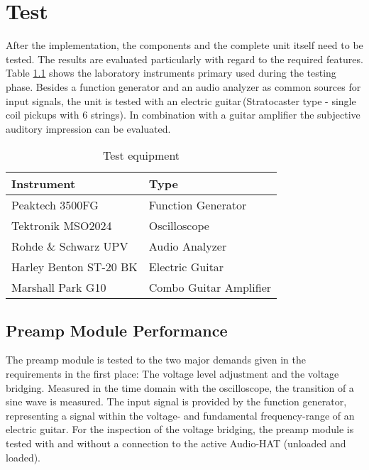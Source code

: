 \newpage
\chapter{Test}

After the implementation, the components and the complete unit itself need to be tested. The results are evaluated particularly with regard to the required features.
Table \ref{tab:equipment} shows the laboratory instruments primary used during the testing phase.
Besides a function generator and an audio analyzer as common sources for input signals, the unit is tested with an electric guitar\,(Stratocaster type - single coil pickups with 6 strings). In combination with a guitar amplifier the subjective auditory impression can be evaluated.

\begin{table}[H]
\centering
\begin{tabular}{ll}
	\hline
	\textbf{Instrument} & \textbf{Type}  \\
	\hline
	Peaktech 3500FG & Function Generator  \\
	Tektronik MSO2024 & Oscilloscope  \\
	Rohde \& Schwarz UPV & Audio Analyzer \\
	Harley Benton ST-20 BK & Electric Guitar \\
	Marshall Park G10 & Combo Guitar Amplifier \\
	\hline
\end{tabular}
\caption{Test equipment}
\label{tab:equipment}
\end{table}




\section{Preamp Module Performance}


The preamp module is tested to the two major demands given in the requirements in the first place:
The voltage level adjustment and the voltage bridging. Measured in the time domain with the oscilloscope, the transition of a sine wave is measured. The input signal is provided by the function generator, representing a signal within the voltage- and fundamental frequency-range of an electric guitar. For the inspection of the voltage bridging, the preamp module is tested with and without a connection to the active Audio-HAT (unloaded and loaded).

